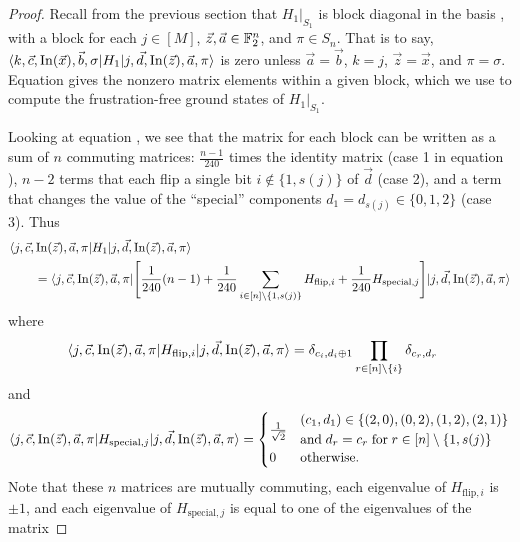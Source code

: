 \documentclass[../thesis-main/thesis-main]{subfiles}
\begin{document}
\begin{proof}
Recall from the previous section that $H_{1}|_{S_1}$ is block diagonal in the basis , with a block for each $j\in[M]$, $\vec{z},\vec{a}\in\mathbb{F}_2^{n}$, and $\pi\in S_n$. That is to say, $\langle k,\vec{c},\operatorname{In}(\vec{x}),\vec{b},\sigma|H_{1}|j,\vec{d},\operatorname{In}(\vec{z}),\vec{a},\pi\rangle$ is zero unless $\vec{a}=\vec{b}$, $k=j$, $\vec{z}=\vec{x}$, and $\pi=\sigma$. Equation  gives the nonzero matrix elements within a given block, which we use to compute the frustration-free ground states of $H_{1}|_{S_{1}}$.

Looking at equation , we see that the matrix for each block can be written as a sum of $n$ commuting matrices: $\frac{n-1}{240}$ times the identity matrix (case 1 in equation ), $n-2$ terms that each flip a single bit $i\notin\{1,s(j)\}$ of $\vec{d}$ (case 2), and a term that changes the value of the ``special'' components $d_{1}=d_{s(j)}\in\{0,1,2\}$ (case 3). Thus
\begin{align}
&\langle j,\vec{c},\operatorname{In}(\vec{z}),\vec{a},\pi|H_{1}|j,\vec{d},\operatorname{In}(\vec{z}),\vec{a},\pi\rangle\nonumber\\
&\qquad =\langle j,\vec{c},\operatorname{In}(\vec{z}),\vec{a},\pi|\Bigg[\frac{1}{240}(n-1)+\frac{1}{240}\sum_{i\in[n]\setminus\{1,s(j)\}}H_{\mathrm{flip},i}+\frac{1}{240}H_{\mathrm{special},j}\Bigg]|j,\vec{d},\operatorname{In}(\vec{z}),\vec{a},\pi\rangle
\end{align}
where
\begin{align}
\langle j,\vec{c},\operatorname{In}(\vec{z}),\vec{a},\pi |H_{\mathrm{flip},i}|j,\vec{d},\operatorname{In}(\vec{z}),\vec{a},\pi\rangle &= \delta_{c_{i},d_{i}\oplus1} \prod_{r\in[n]\setminus\{i\}}\delta_{c_{r},d_{r}}
\end{align}
and 
\begin{equation}
\langle j,\vec{c},\operatorname{In}(\vec{z}),\vec{a},\pi|H_{\mathrm{special},j}|j,\vec{d},\operatorname{In}(\vec{z}),\vec{a},\pi\rangle=\begin{cases}
\frac{1}{\sqrt{2}} & \begin{aligned}
  &(c_{1},d_{1})\in\{(2,0),(0,2),(1,2),(2,1)\}\\ 
  &\text{and}\; d_{r}=c_{r}\;\text{for}\; r\in [n]\setminus\{1,s(j)\}
\end{aligned}\\
0 & \text{otherwise.}
\end{cases}
\end{equation}
Note that these $n$ matrices are mutually commuting, each eigenvalue of $H_{\mathrm{flip},i}$ is $\pm1$, and each eigenvalue of $H_{\mathrm{special},j}$ is equal to one of the eigenvalues of the matrix 

\end{proof}
\end{document}
